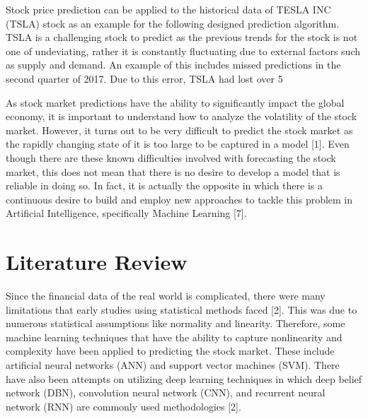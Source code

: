 \documentclass[12pt,a4paper]{article}
\begin{document}
Stock price prediction can be applied to the historical data of TESLA INC (TSLA) stock as an example for the following designed prediction algorithm. TSLA is a challenging stock to predict as the previous trends for the stock is not one of undeviating, rather it is constantly fluctuating due to external factors such as supply and demand. An example of this includes missed predictions in the second quarter of 2017. Due to this error, TSLA had lost over 5%

As stock market predictions have the ability to significantly impact the global economy, it is important to understand how to analyze the volatility of the stock market. However, it turns out to be very difficult to predict the stock market as the rapidly changing state of it is too large to be captured in a model [1]. Even though there are these known difficulties involved with forecasting the stock market, this does not mean that there is no desire to develop a model that is reliable in doing so. In fact, it is actually the opposite in which there is a continuous desire to build and employ new approaches to tackle this problem in Artificial Intelligence, specifically Machine Learning [7]. 

\section{Literature Review}
Since the financial data of the real world is complicated, there were many limitations that early studies using statistical methods faced [2]. This was due to numerous statistical assumptions like normality and linearity. Therefore, some machine learning techniques that have the ability to capture nonlinearity and complexity have been applied to predicting the stock market. These include artificial neural networks (ANN) and support vector machines (SVM). There have also been attempts on utilizing deep learning techniques in which deep belief network (DBN), convolution neural network (CNN), and recurrent neural network (RNN) are commonly used methodologies [2]. 
\end{document}
